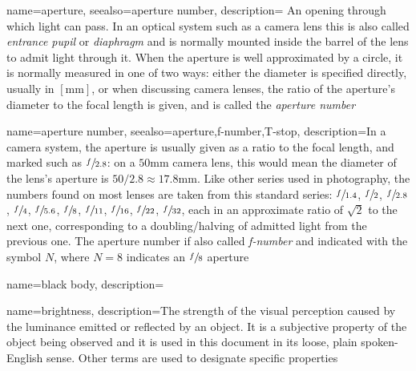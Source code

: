 







{
	name=aperture,
	seealso={aperture number},
	description={
		An opening through which light can pass. 
		In an optical system such as a camera lens this is also called 
		\textsl{entrance pupil} or \textsl{diaphragm} and is normally
		mounted inside the barrel of the lens to admit light through it. 
		When the aperture is well approximated by a circle, it is normally measured 
		in one of two ways: either the diameter is specified directly, 
		usually in $[\unit{\milli\meter}]$, or when discussing camera lenses, the ratio 
		of the aperture's diameter to the focal length is given, 
		and is called the \textsl{aperture number}}
}

{
	name={aperture number},
	seealso={aperture,f-number,T-stop},
	description={In a camera system, the aperture is usually given as a ratio to the
		focal length, and marked such as $\sfrac{f}{2.8}$: on a $50\unit{\milli\meter}$ 
		camera lens, this would mean the diameter of the lens's aperture 
		is $50 / 2.8 \approx 17.8\unit{\milli\meter}$. 
		Like other series used in photography, the
		numbers found on most lenses are taken from this standard series:
		$\sfrac{f}{1.4}$, $\sfrac{f}{2}$, $\sfrac{f}{2.8}$, $\sfrac{f}{4}$, $\sfrac{f}{5.6}$,
		$\sfrac{f}{8}$, $\sfrac{f}{11}$, $\sfrac{f}{16}$, $\sfrac{f}{22}$, $\sfrac{f}{32}$,
		each in an approximate ratio of $\sqrt{2}$ to the next one, corresponding to a doubling/halving of admitted light from the previous one.
	    The aperture number if also called \textsl{f-number} and indicated with the symbol
    	$N$, where $N=8$ indicates an $\sfrac{f}{8}$ aperture}
}

{
	name={black body},
	description=\nopostdesc
}

{
  name=brightness,
  description={The strength of the visual perception caused by the luminance emitted or
    reflected by an object. It is a subjective property of the object being
    observed and it is used in this document in its loose, 
    plain spoken-English sense. 
    Other terms are used to designate specific properties}
}


